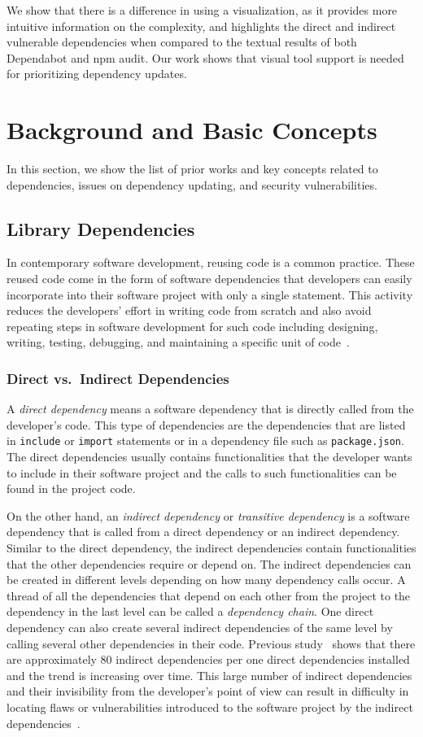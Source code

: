 \documentclass[conference]{IEEEtran}
\begin{document}
	We show that there is a difference in using a visualization, as it provides more intuitive information on the complexity, and highlights the direct and indirect vulnerable dependencies when compared to the textual results of both Dependabot and npm audit.
	Our work shows that  visual tool support is needed for prioritizing dependency updates.
	
	\section{Background and Basic Concepts}
	In this section, we show the list of prior works and key concepts related to dependencies, issues on dependency updating, and security vulnerabilities.
	
	\subsection{Library Dependencies}
	In contemporary software development, reusing code is a common practice. These reused code come in the form of software dependencies that developers can easily incorporate into their software project with only a single statement. This activity reduces the developers' effort in writing code from scratch and also avoid repeating steps in software development for such code including designing, writing, testing, debugging, and maintaining a specific unit of code~\cite{Cox2019}.
	
	\subsubsection{Direct vs.~Indirect Dependencies}
	A \textit{direct dependency} means a software dependency that is directly called from the developer's code. This type of dependencies are the dependencies that are listed in \texttt{include} or \texttt{import} statements or in a dependency file such as \texttt{package.json}. The direct dependencies usually contains functionalities that the developer wants to include in their software project and the calls to such functionalities can be found in the project code. 
	
	On the other hand, an \textit{indirect dependency} or \textit{transitive dependency} is a software dependency that is called from a direct dependency or an indirect dependency. Similar to the direct dependency, the indirect dependencies contain functionalities that the other dependencies require or depend on. The indirect dependencies can be created in different levels depending on how many dependency calls occur. A thread of all the dependencies that depend on each other from the project to the dependency in the last level can be called a \textit{dependency chain}. 
	One direct dependency can also create several indirect dependencies of the same level by calling several other dependencies in their code. Previous study~\cite{Zimmermann2019} shows that there are approximately 80 indirect dependencies per one direct dependencies installed and the trend is increasing over time. This large number of indirect dependencies and their invisibility from the developer's point of view can result in difficulty in locating flaws or vulnerabilities introduced to the software project by the indirect dependencies~\cite{Cox2019}.
	
\end{document}
